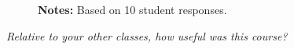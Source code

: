 \begin{boenumerate}
\begin{figure}[h!]\centering
{}\hspace{0.5cm}
\begin{center}
\begin{minipage}[t]{0.85\columnwidth}\vspace{-0.75cm}
\item\scriptsize{\textbf{Notes:} Based on 10 student responses.}
\end{minipage}
\end{center}
\end{figure}
\FloatBarrier
\newpage
\item \textit{Relative to your other classes, how useful was this course?}


\end{boenumerate}
